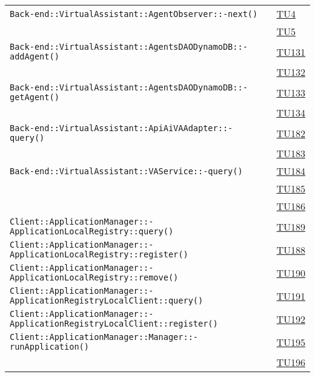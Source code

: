 \begin{longtable}{|>{\centering}m{12cm}|m{1cm}<{\centering}|}
\texttt{Back-end::VirtualAssistant::AgentObserver::-\linebreak next()} & \hyperlink{TU4}{TU4}\\ & \hyperlink{TU5}{TU5}\\ \hline
\texttt{Back-end::VirtualAssistant::AgentsDAODynamoDB::-\linebreak addAgent()} & \hyperlink{TU131}{TU131}\\ & \hyperlink{TU132}{TU132}\\ \hline
\texttt{Back-end::VirtualAssistant::AgentsDAODynamoDB::-\linebreak getAgent()} & \hyperlink{TU133}{TU133}\\ & \hyperlink{TU134}{TU134}\\ \hline
\texttt{Back-end::VirtualAssistant::ApiAiVAAdapter::-\linebreak query()} & \hyperlink{TU182}{TU182}\\ & \hyperlink{TU183}{TU183}\\ \hline
\texttt{Back-end::VirtualAssistant::VAService::-\linebreak query()} & \hyperlink{TU184}{TU184}\\ & \hyperlink{TU185}{TU185}\\ & \hyperlink{TU186}{TU186}\\ \hline
\texttt{Client::ApplicationManager::-\linebreak ApplicationLocalRegistry::query()} & \hyperlink{TU189}{TU189}\\ \hline
\texttt{Client::ApplicationManager::-\linebreak ApplicationLocalRegistry::register()} & \hyperlink{TU188}{TU188}\\ \hline
\texttt{Client::ApplicationManager::-\linebreak ApplicationLocalRegistry::remove()} & \hyperlink{TU190}{TU190}\\ \hline
\texttt{Client::ApplicationManager::-\linebreak ApplicationRegistryLocalClient::query()} & \hyperlink{TU191}{TU191}\\ \hline
\texttt{Client::ApplicationManager::-\linebreak ApplicationRegistryLocalClient::register()} & \hyperlink{TU192}{TU192}\\ \hline
\texttt{Client::ApplicationManager::Manager::-\linebreak runApplication()} & \hyperlink{TU195}{TU195}\\ & \hyperlink{TU196}{TU196}\\ \hline

\end{longtable}
